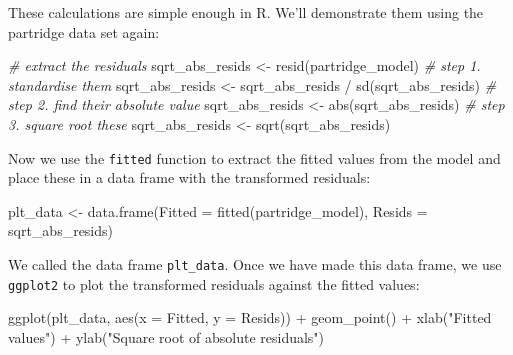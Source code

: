 \documentclass[
]{book}
\newenvironment{Shaded}{\begin{snugshade}}{\end{snugshade}}
\newcommand{\AttributeTok}[1]{\textcolor[rgb]{0.77,0.63,0.00}{#1}}
\newcommand{\CommentTok}[1]{\textcolor[rgb]{0.56,0.35,0.01}{\textit{#1}}}
\newcommand{\FunctionTok}[1]{\textcolor[rgb]{0.00,0.00,0.00}{#1}}
\newcommand{\NormalTok}[1]{#1}
\newcommand{\OtherTok}[1]{\textcolor[rgb]{0.56,0.35,0.01}{#1}}
\newcommand{\SpecialCharTok}[1]{\textcolor[rgb]{0.00,0.00,0.00}{#1}}
\newcommand{\StringTok}[1]{\textcolor[rgb]{0.31,0.60,0.02}{#1}}
\begin{document}
These calculations are simple enough in R. We'll demonstrate them using the partridge data set again:

\begin{Shaded}
\begin{Highlighting}[]
\CommentTok{\# extract the residuals}
\NormalTok{sqrt\_abs\_resids }\OtherTok{\textless{}{-}} \FunctionTok{resid}\NormalTok{(partridge\_model)}
\CommentTok{\# step 1. standardise them}
\NormalTok{sqrt\_abs\_resids }\OtherTok{\textless{}{-}}\NormalTok{ sqrt\_abs\_resids }\SpecialCharTok{/} \FunctionTok{sd}\NormalTok{(sqrt\_abs\_resids)}
\CommentTok{\# step 2. find their absolute value}
\NormalTok{sqrt\_abs\_resids }\OtherTok{\textless{}{-}} \FunctionTok{abs}\NormalTok{(sqrt\_abs\_resids)}
\CommentTok{\# step 3. square root these}
\NormalTok{sqrt\_abs\_resids }\OtherTok{\textless{}{-}} \FunctionTok{sqrt}\NormalTok{(sqrt\_abs\_resids)}
\end{Highlighting}
\end{Shaded}

Now we use the \texttt{fitted} function to extract the fitted values from the model and place these in a data frame with the transformed residuals:

\begin{Shaded}
\begin{Highlighting}[]
\NormalTok{plt\_data }\OtherTok{\textless{}{-}} 
  \FunctionTok{data.frame}\NormalTok{(}\AttributeTok{Fitted =} \FunctionTok{fitted}\NormalTok{(partridge\_model), }\AttributeTok{Resids =}\NormalTok{ sqrt\_abs\_resids)}
\end{Highlighting}
\end{Shaded}

We called the data frame \texttt{plt\_data}. Once we have made this data frame, we use \texttt{ggplot2} to plot the transformed residuals against the fitted values:

\begin{Shaded}
\begin{Highlighting}[]
\FunctionTok{ggplot}\NormalTok{(plt\_data, }\FunctionTok{aes}\NormalTok{(}\AttributeTok{x =}\NormalTok{ Fitted, }\AttributeTok{y =}\NormalTok{ Resids)) }\SpecialCharTok{+} 
  \FunctionTok{geom\_point}\NormalTok{() }\SpecialCharTok{+} 
  \FunctionTok{xlab}\NormalTok{(}\StringTok{"Fitted values"}\NormalTok{) }\SpecialCharTok{+} \FunctionTok{ylab}\NormalTok{(}\StringTok{"Square root of absolute residuals"}\NormalTok{)}
\end{Highlighting}
\end{Shaded}
\end{document}
